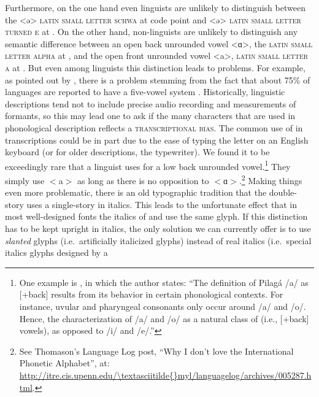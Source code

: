 Furthermore, on the one hand even linguists are unlikely to distinguish between
the <ə> \textsc{latin small letter schwa} at code point  and <ǝ>
\textsc{latin small letter turned e} at . On the other hand,
non-linguists are unlikely to distinguish any semantic difference between an
open back unrounded vowel <ɑ>, the \textsc{latin small letter alpha} at
, and the open front unrounded vowel <a>, \textsc{latin small letter
a} at . But even among linguists this distinction leads to problems.
For example, as pointed out by \citet{Mielke2009}, there is a problem stemming
from the fact that about 75\% of languages are reported to have a five-vowel
system \citep{Maddieson1984}. Historically, linguistic descriptions tend not to
include precise audio recording and measurements of formants, so this may lead
one to ask if the many characters that are used in phonological description
reflects a \textsc{transcriptional bias}. The common use of in transcriptions
could be in part due to the ease of typing the letter on an English keyboard (or
for older descriptions, the typewriter). We found it to be exceedingly rare that
a linguist uses for a low back unrounded vowel.\footnote{One example is
\citet[75]{Vidal2001a}, in which the author states: ``The definition of Pilagá
/a/ as {[}+back{]} results from its behavior in certain phonological contexts.
For instance, uvular and pharyngeal consonants only occur around /a/ and /o/.
Hence, the characterization of /a/ and /o/ as a natural class of (i.e.,
{[}+back{]} vowels), as opposed to /i/ and /e/.''} They simply use $<$a$>$ as
long as there is no opposition to $<$ɑ$>$.\footnote{See Thomason's Language Log
post, ``Why I don't love the International Phonetic Alphabet'', at:
\url{http://itre.cis.upenn.edu/\textasciitilde{}myl/languagelog/archives/005287.html}.}
Making things even more problematic, there is an old typographic tradition that
the double-story uses a single-story in italics. This leads to the unfortunate
effect that in most well-designed fonts the italics of and use the same glyph.
If this distinction has to be kept upright in italics, the only solution we can
currently offer is to use \textit{slanted} glyphs (i.e.~artificially italicized
glyphs) instead of real italics (i.e.~special italics glyphs designed by a
